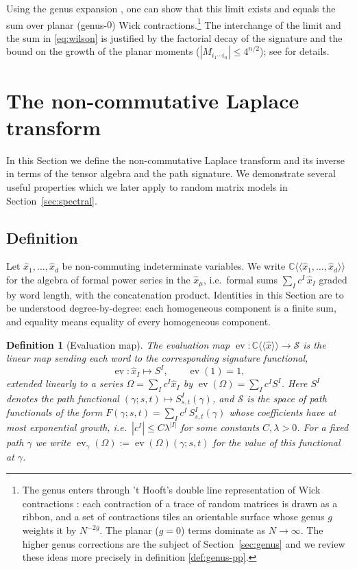 \documentclass[11pt,a4paper]{article}
\newtheorem{definition}[theorem]{Definition}
\DeclareMathOperator{\ev}{ev}
\newcommand{\xh}{\hat{x}}
\begin{document}
Using the genus expansion \cite{t1993planar,anderson2010introduction}, one can show that this limit exists and equals the sum over planar (genus-$0$) Wick contractions.\footnote{The genus enters through 't Hooft's double line representation of Wick contractions \cite{t1993planar}: each contraction of a trace of random matrices is drawn as a ribbon, and a set of contractions tiles an orientable surface whose genus $g$ weights it by $N^{-2g}$. The planar ($g=0$) terms dominate as $N\to\infty$. The higher genus corrections are the subject of Section~\ref{sec:genus} and we review these ideas more precisely in definition \ref{def:genus-pp}.}  The interchange of the limit and the sum in \eqref{eq:wilson} is justified by the factorial decay of the signature and the bound on the growth of the planar moments ($|M_{i_1\cdots i_n}|\leq 4^{n/2}$); see \cite{cass2026free} for details.




\section{The non-commutative Laplace transform}\label{sec:nc-laplace}


In this Section we define the non-commutative Laplace transform and its inverse in terms of the tensor algebra and the path signature. We demonstrate several useful properties which we later apply to random matrix models in Section~\ref{sec:spectral}.

\subsection{Definition}

Let $\xh_1,\ldots,\xh_d$ be non-commuting indeterminate variables. We write $\mathbb{C}\langle\langle\xh_1,\ldots,\xh_d\rangle\rangle$ for the algebra of formal power series in the $\xh_\mu$, i.e.\ formal sums $\sum_I c^{I}\,\xh_I$ graded by word length, with the concatenation product. Identities in this Section are to be understood degree-by-degree: each homogeneous component is a finite sum, and equality means equality of every homogeneous component. 

\begin{definition}[Evaluation map]\label{def:ev}
The \emph{evaluation map}
$\ev\colon\mathbb{C}\langle\langle\xh\rangle\rangle\to\mathcal{S}$ is the linear map sending each word to the corresponding signature functional,
\begin{equation}\label{eq:ev}
  \ev\colon\xh_I\longmapsto S^{I},
  \qquad \ev(1)=1,
\end{equation}
extended linearly to a series $\Omega=\sum_I c^I\xh_I$ by $\ev(\Omega)=\sum_I c^I S^I$. Here $S^I$ denotes the path functional $(\gamma;s,t)\mapsto S^{I}_{s,t}(\gamma)$, and $\mathcal{S}$ is the space of path functionals of the form $F(\gamma;s,t)=\sum_{I}c^{I}\,S^{I}_{s,t}(\gamma)$ whose coefficients have at most exponential growth, i.e.\ $|c^I|\leq C\lambda^{|I|}$ for some constants $C,\lambda>0$. For a fixed path $\gamma$ we write $\ev_\gamma(\Omega):=\ev(\Omega)(\gamma;s,t)$ for the value of this functional at $\gamma$.
\end{definition}
\end{document}
